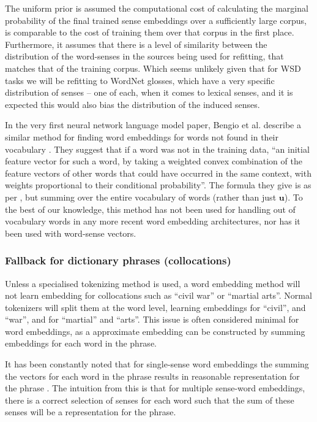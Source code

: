 \documentclass{sig-alternate}
\renewcommand{\u}{\mathbf{u}}
\begin{document}
The uniform prior is assumed the computational cost of calculating the marginal probability of the final trained sense embeddings over a sufficiently large corpus, is comparable to the cost of training them over that corpus in the first place. Furthermore, it assumes that there is a level of similarity between the distribution of the word-senses in the sources being used for refitting, that matches that of the training corpus. Which seems unlikely given that for WSD tasks we will be refitting to WordNet glosses, which have a very specific distribution of senses -- one of each, when it comes to lexical senses, and it is expected this would also bias the distribution of the induced senses.

In the very first neural network language model paper, Bengio et al. describe a similar method for finding word embeddings for words not found in their vocabulary \parencite{NPLM}. They suggest that if a word was not in the training data, \enquote{an initial feature vector for such a word, by taking a weighted convex combination of the feature vectors of other words that could have occurred in the same context, with weights proportional to their conditional probability}. The formula they give is as per , but summing over the entire vocabulary of words (rather than just $\u$). To the best of our knowledge, this method has not been used for handling out of vocabulary words in any more recent word embedding architectures, nor has it been used with word-sense vectors.


\subsubsection {Fallback for dictionary phrases (collocations)}
Unless a specialised tokenizing method is used, a word embedding method will not learn embedding for collocations such as ``civil war'' or ``martial arts''. Normal tokenizers will split them at the word level, learning embeddings for ``civil'', and ``war'', and for ``martial'' and ``arts''. This issue is often considered minimal for word embeddings, as a approximate embedding can be constructed by summing embeddings for each word  in the phrase.

It has been constantly noted that for single-sense word embeddings the summing the vectors for each word in the phrase results in reasonable representation for the phrase  \parencite{mikolovSkip} . The intuition from this is that for multiple sense-word embeddings, there is a correct selection of senses for each word such that the sum of these senses will be a representation for the phrase.
\end{document}
